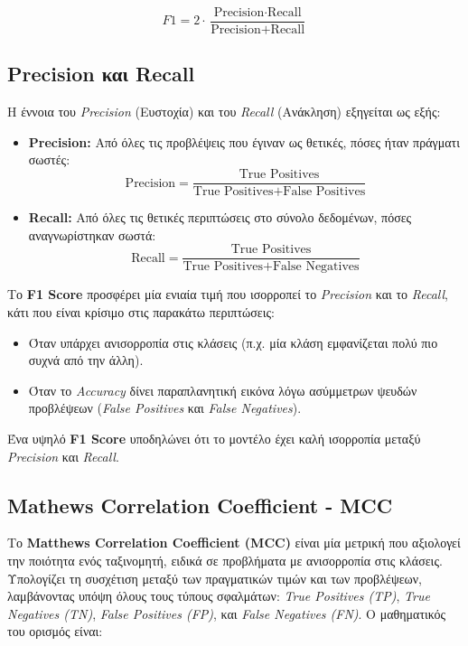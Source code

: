 \documentclass[diploma]{softlab-thesis}
\begin{document}
\[
F1 = 2 \cdot \frac{\text{Precision} \cdot \text{Recall}}{\text{Precision} + \text{Recall}}
\]

\subsection*{Precision και Recall}
Η έννοια του \textit{Precision} (Ευστοχία) και του \textit{Recall} (Ανάκληση) εξηγείται ως εξής:
\begin{itemize}
    \item \textbf{Precision:} Από όλες τις προβλέψεις που έγιναν ως θετικές, πόσες ήταν πράγματι σωστές:
    \[
    \text{Precision} = \frac{\text{True Positives}}{\text{True Positives} + \text{False Positives}}
    \]
    \item \textbf{Recall:} Από όλες τις θετικές περιπτώσεις στο σύνολο δεδομένων, πόσες αναγνωρίστηκαν σωστά:
    \[
    \text{Recall} = \frac{\text{True Positives}}{\text{True Positives} + \text{False Negatives}}
    \]
\end{itemize}


Το \textbf{F1 Score} προσφέρει μία ενιαία τιμή που ισορροπεί το \textit{Precision} και το \textit{Recall}, κάτι που είναι κρίσιμο στις παρακάτω περιπτώσεις:
\begin{itemize}
    \item Όταν υπάρχει ανισορροπία στις κλάσεις (π.χ. μία κλάση εμφανίζεται πολύ πιο συχνά από την άλλη).
    \item Όταν το \textit{Accuracy} δίνει παραπλανητική εικόνα λόγω ασύμμετρων ψευδών προβλέψεων (\textit{False Positives} και \textit{False Negatives}).
\end{itemize}

Ένα υψηλό \textbf{F1 Score} υποδηλώνει ότι το μοντέλο έχει καλή ισορροπία μεταξύ \textit{Precision} και \textit{Recall}.

\subsection{Mathews Correlation Coefficient - MCC}


Το \textbf{Matthews Correlation Coefficient (MCC)} είναι μία μετρική που αξιολογεί την ποιότητα ενός ταξινομητή, ειδικά σε προβλήματα με ανισορροπία στις κλάσεις. Υπολογίζει τη συσχέτιση μεταξύ των πραγματικών τιμών και των προβλέψεων, λαμβάνοντας υπόψη όλους τους τύπους σφαλμάτων: \textit{True Positives (TP)}, \textit{True Negatives (TN)}, \textit{False Positives (FP)}, και \textit{False Negatives (FN)}. Ο μαθηματικός του ορισμός είναι:
\end{document}
